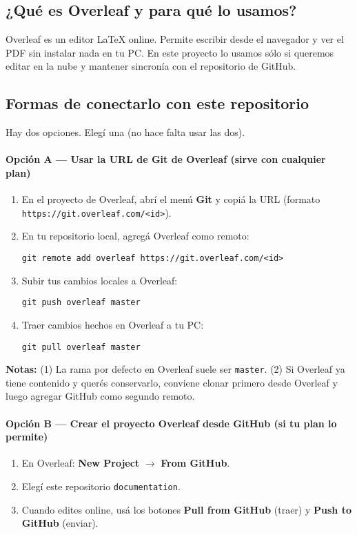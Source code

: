 \subsection*{¿Qué es Overleaf y para qué lo usamos?}
Overleaf es un editor \LaTeX{} online. Permite escribir desde el navegador y ver el PDF sin instalar nada en tu PC.
En este proyecto lo usamos sólo si queremos editar en la nube y mantener sincronía con el repositorio de GitHub.

\subsection*{Formas de conectarlo con este repositorio}
Hay dos opciones. Elegí una (no hace falta usar las dos).

\paragraph{Opción A — Usar la URL de Git de Overleaf (sirve con cualquier plan)}
\begin{enumerate}[leftmargin=1.2em]
  \item En el proyecto de Overleaf, abrí el menú \textbf{Git} y copiá la URL (formato \texttt{https://git.overleaf.com/<id>}).
  \item En tu repositorio local, agregá Overleaf como remoto:
\begin{verbatim}
git remote add overleaf https://git.overleaf.com/<id>
\end{verbatim}
  \item Subir tus cambios locales a Overleaf:
\begin{verbatim}
git push overleaf master
\end{verbatim}
  \item Traer cambios hechos en Overleaf a tu PC:
\begin{verbatim}
git pull overleaf master
\end{verbatim}
\end{enumerate}
\textbf{Notas:} (1) La rama por defecto en Overleaf suele ser \texttt{master}.
(2) Si Overleaf ya tiene contenido y querés conservarlo, conviene clonar primero desde Overleaf y luego agregar GitHub como segundo remoto.

\paragraph{Opción B — Crear el proyecto Overleaf desde GitHub (si tu plan lo permite)}
\begin{enumerate}[leftmargin=1.2em]
  \item En Overleaf: \textbf{New Project} $\rightarrow$ \textbf{From GitHub}.
  \item Elegí este repositorio \texttt{documentation}.
  \item Cuando edites online, usá los botones \textbf{Pull from GitHub} (traer) y \textbf{Push to GitHub} (enviar).
\end{enumerate}

